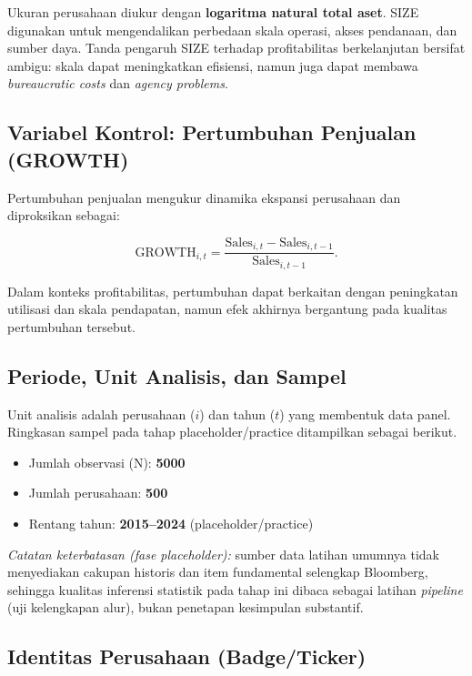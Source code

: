 \documentclass[12pt,a4paper]{report}
\providecommand{\tightlist}{%
  \setlength{\itemsep}{0pt}\setlength{\parskip}{0pt}%
}
\begin{document}
Ukuran perusahaan diukur dengan \textbf{logaritma natural total aset}.
SIZE digunakan untuk mengendalikan perbedaan skala operasi, akses
pendanaan, dan sumber daya. Tanda pengaruh SIZE terhadap profitabilitas
berkelanjutan bersifat ambigu: skala dapat meningkatkan efisiensi, namun
juga dapat membawa \emph{bureaucratic costs} dan \emph{agency problems}.

\hypertarget{variabel-kontrol-pertumbuhan-penjualan-growth}{%
\subsection{Variabel Kontrol: Pertumbuhan Penjualan
(GROWTH)}\label{variabel-kontrol-pertumbuhan-penjualan-growth}}

Pertumbuhan penjualan mengukur dinamika ekspansi perusahaan dan
diproksikan sebagai:

\[
\mathrm{GROWTH}_{i,t}=\frac{\mathrm{Sales}_{i,t}-\mathrm{Sales}_{i,t-1}}{\mathrm{Sales}_{i,t-1}}.
\]

Dalam konteks profitabilitas, pertumbuhan dapat berkaitan dengan
peningkatan utilisasi dan skala pendapatan, namun efek akhirnya
bergantung pada kualitas pertumbuhan tersebut.

\hypertarget{periode-unit-analisis-dan-sampel}{%
\subsection{Periode, Unit Analisis, dan
Sampel}\label{periode-unit-analisis-dan-sampel}}

Unit analisis adalah perusahaan (\(i\)) dan tahun (\(t\)) yang membentuk
data panel. Ringkasan sampel pada tahap placeholder/practice ditampilkan
sebagai berikut.

\begin{itemize}
\tightlist
\item
  Jumlah observasi (N): \textbf{5000}
\item
  Jumlah perusahaan: \textbf{500}
\item
  Rentang tahun: \textbf{2015--2024} (placeholder/practice)
\end{itemize}

\emph{Catatan keterbatasan (fase placeholder):} sumber data latihan
umumnya tidak menyediakan cakupan historis dan item fundamental
selengkap Bloomberg, sehingga kualitas inferensi statistik pada tahap
ini dibaca sebagai latihan \emph{pipeline} (uji kelengkapan alur), bukan
penetapan kesimpulan substantif.

\hypertarget{identitas-perusahaan-badgeticker}{%
\subsection{Identitas Perusahaan
(Badge/Ticker)}\label{identitas-perusahaan-badgeticker}}
\end{document}
